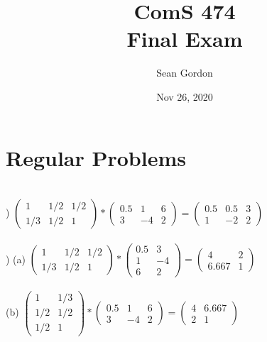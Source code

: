 \documentclass[12pt]{article}
\title{ComS 474\\Final Exam}
\author{Sean Gordon}
\date{Nov 26, 2020}
\begin{document}
\maketitle


\section{Regular Problems}
\ \\


) $
\begin{pmatrix}
1 & 1/2 & 1/2 \\
1/3 & 1/2 & 1
\end{pmatrix} * 
\begin{pmatrix}
0.5 & 1 & 6 \\
3 & -4 & 2
\end{pmatrix} = 
\begin{pmatrix}
0.5 & 0.5 & 3 \\
1 & -2 & 2
\end{pmatrix}$\\



\noindent \hrulefill \\



) 
(a) $
\begin{pmatrix}
1 & 1/2 & 1/2 \\
1/3 & 1/2 & 1
\end{pmatrix} * 
\begin{pmatrix}
0.5 & 3 \\
1 & -4 \\
6 & 2
\end{pmatrix} = 
\begin{pmatrix}
4 & 2 \\
6.667 & 1
\end{pmatrix}$\\\\

(b) $
\begin{pmatrix}
1 & 1/3 \\
1/2 & 1/2 \\
1/2 & 1
\end{pmatrix} * 
\begin{pmatrix}
0.5 & 1 & 6 \\
3 & -4 & 2
\end{pmatrix} = 
\begin{pmatrix}
4 & 6.667 \\
2 & 1
\end{pmatrix}$\\
\end{document}
